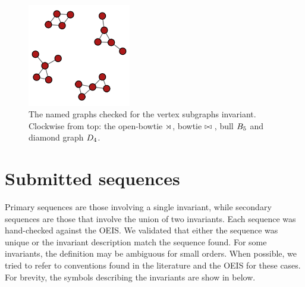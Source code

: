 \documentclass[12pt]{article}
\begin{document}
\begin{appendices}
\begin{figure}[h]
  \includegraphics[width=0.4\textwidth]{simple_drawings/combined_subgraphs.png}
  \caption{The named graphs checked for the vertex subgraphs invariant. Clockwise from top: the open-bowtie $\rtimes{}$, bowtie $\bowtie{}$, bull  $B_5{}$ and diamond graph $D_4{}$.}
  \label{fig:namedgraphs}
\end{figure}

\section{Submitted sequences}
\label{app:submittedseq}

Primary sequences are those involving a single invariant, while secondary sequences are those that involve the union of two invariants.
Each sequence was hand-checked against the OEIS.
We validated that either the sequence was unique or the invariant description match the sequence found.
For some invariants, the definition may be ambiguous for small orders.
When possible, we tried to refer to conventions found in the literature and the OEIS for these cases.
For brevity, the symbols describing the invariants are show in below. %

\newcommand{\VARsubgraphfree}[1]{g)}


\end{appendices}
\end{document}
